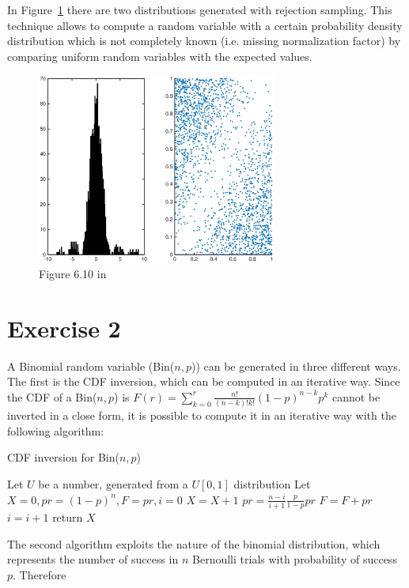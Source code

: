 \documentclass[10pt]{article}
\begin{document}
In Figure~\ref{fig:610} there are two distributions generated with rejection sampling. This technique allows to compute a random variable with a certain probability density distribution which is not completely known (i.e. missing normalization factor) by comparing uniform random variables with the expected values.
\begin{figure}
  \centering
  \includegraphics[width=0.7\textwidth]{images/hw2_1_610}
  \caption{Figure 6.10 in \cite{leb}}
  \label{fig:610}
\end{figure}

\section{Exercise 2}
A Binomial random variable (Bin($n, p$)) can be generated in three different ways. The first is the CDF inversion, which can be computed in an iterative way. Since the CDF of a Bin($n, p$) is $F(r) = \sum_{k = 0}^{r} \frac{n!}{(n-k)!k!} (1-p)^{n-k} p^k$ cannot be inverted in a close form, it is possible to compute it in an iterative way with the following algorithm:

\begin{algorithm}
  \caption{CDF inversion for Bin($n, p$)}\label{cdfinvbin}
  \begin{algorithmic}[1]
    \Procedure{}{}
    \State Let $U$ be a number, generated from a $U[0,1]$ distribution
    \State Let $X = 0, pr = (1-p)^n, F = pr, i = 0$
    \State $X = X + 1$
    \State $pr = \frac{n-i}{i+1} \frac{p}{1-p} pr$
    \State $F = F + pr$
    \State $i = i + 1$
    \EndWhile
    \State return $X$
    \EndProcedure
  \end{algorithmic}
\end{algorithm}

The second algorithm exploits the nature of the binomial distribution, which represents the number of success in $n$ Bernoulli trials with probability of success $p$. Therefore
\end{document}
